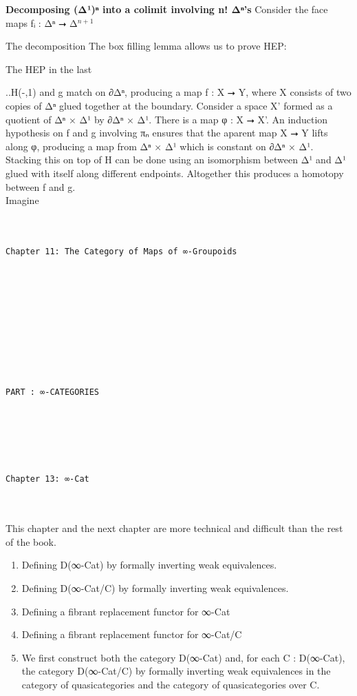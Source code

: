 \documentclass{book}
\theoremstyle{definition}
\newcounter{pcounter}
\renewcommand{\chapter}[1]{
\newpage
{
\Huge 
\begin{center}
\ \\
\ \\
\thispagestyle{empty}
\texttt{#1}
\end{center}}
\ \\
\ \\
}
\newcounter{partcount}
\renewcommand{\part}[1]{
\newpage
{
\Huge 
\begin{center}
\ \\
\ \\
\ \\
\ \\
\ \\
\ \\
\thispagestyle{empty}
\texttt{PART {\thepartcount}: #1}
\stepcounter{partcount}
\end{center}}
\ \\
\ \\
}
\begin{document}
{\bf Decomposing (Δ¹)ⁿ into a colimit involving n! Δⁿ's} Consider the face maps fᵢ : Δⁿ ⭢ Δ${}^{n+1}$


The decomposition 
The box filling lemma allows us to prove HEP:


The HEP in the last 

..H(-,1) and g match on ∂Δⁿ, producing a map f : X ⭢ Y, where X consists of two copies of Δⁿ glued together at the boundary. Consider a space X' formed as a quotient of Δⁿ × Δ¹ by ∂Δⁿ × Δ¹. There is a map φ : X ⭢ X'. An induction hypothesis on f and g involving πₙ ensures that the aparent map X ⭢ Y lifts along φ, producing a map from Δⁿ × Δ¹ which is constant on ∂Δⁿ × Δ¹. Stacking this on top of H can be done using an isomorphism between Δ¹ and Δ¹ glued with itself along different endpoints. Altogether this produces a homotopy between f and g.\\

Imagine 


\chapter{Chapter 11: The Category of Maps of ∞-Groupoids}






\part{∞-CATEGORIES}

\chapter{Chapter 13: ∞\texttt{-Cat}}

This chapter and the next chapter are more technical and difficult than the rest of the book.\\

\begin{enumerate}
\item Defining D(∞-Cat) by formally inverting weak equivalences.
\item Defining D(∞-Cat/C) by formally inverting weak equivalences.
\item Defining a fibrant replacement functor for ∞-Cat
\item Defining a fibrant replacement functor for ∞-Cat/C
\item We first construct both the category D(∞-Cat) and, for each C : D(∞-Cat), the category D(∞-Cat/C) by formally inverting weak equivalences in the category of quasicategories and the category of quasicategories over C.
\end{enumerate}
\end{document}
